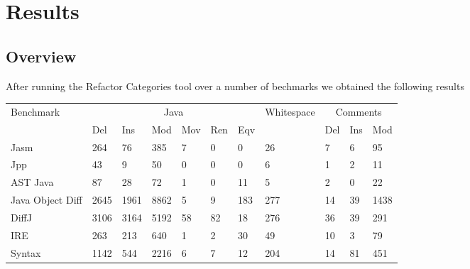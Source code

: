 % 
% 
% 



\section{Results}
\subsection{Overview}
After running the Refactor Categories tool over a number of bechmarks we obtained the following results 

\begin{table}[H]
    \begin{tabular}{l|llllll|l|lll}
    Benchmark        & \multicolumn{6}{|c|}{Java}           & Whitespace & \multicolumn{3}{|c}{Comments} \\ \cline{2-7} \cline{9-11}
    ~                & Del  & Ins  & Mod  & Mov & Ren & Eqv & ~          & Del      & Ins & Mod  \\ \hline
    Jasm             & 264  & 76   & 385  & 7   & 0   & 0   & 26         & 7        & 6   & 95   \\
    Jpp              & 43   & 9    & 50   & 0   & 0   & 0   & 6          & 1        & 2   & 11   \\
    AST Java         & 87   & 28   & 72   & 1   & 0   & 11  & 5          & 2        & 0   & 22   \\
    Java Object Diff & 2645 & 1961 & 8862 & 5   & 9   & 183 & 277        & 14       & 39  & 1438 \\
    DiffJ            & 3106 & 3164 & 5192 & 58  & 82  & 18  & 276        & 36       & 39  & 291  \\
    IRE              & 263  & 213  & 640  & 1   & 2   & 30  & 49         & 10       & 3   & 79   \\
    Syntax           & 1142 & 544  & 2216 & 6   & 7   & 12  & 204        & 14       & 81  & 451  \\
    \end{tabular}
\end{table}







